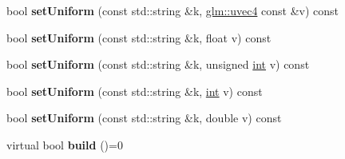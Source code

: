 \begin{DoxyCompactItemize}
\item 
\hypertarget{classgdl_1_1_a_shader_a8b800fb21a0071a28e6093ab99501ae8}{}bool {\bfseries set\+Uniform} (const std\+::string \&k, \hyperlink{group__core__types_gae85130f09c272fcd64da1353c09dddef}{glm\+::uvec4} const \&v) const \label{classgdl_1_1_a_shader_a8b800fb21a0071a28e6093ab99501ae8}

\item 
\hypertarget{classgdl_1_1_a_shader_aa166b1e4cd12cf7e157659946861d121}{}bool {\bfseries set\+Uniform} (const std\+::string \&k, float v) const \label{classgdl_1_1_a_shader_aa166b1e4cd12cf7e157659946861d121}

\item 
\hypertarget{classgdl_1_1_a_shader_ad6091e0ccecf8c062e46482d793e0d6c}{}bool {\bfseries set\+Uniform} (const std\+::string \&k, unsigned \hyperlink{_s_d_l__thread_8h_a6a64f9be4433e4de6e2f2f548cf3c08e}{int} v) const \label{classgdl_1_1_a_shader_ad6091e0ccecf8c062e46482d793e0d6c}

\item 
\hypertarget{classgdl_1_1_a_shader_adde4f6da14c5fd786152d81d0a3bb77f}{}bool {\bfseries set\+Uniform} (const std\+::string \&k, \hyperlink{_s_d_l__thread_8h_a6a64f9be4433e4de6e2f2f548cf3c08e}{int} v) const \label{classgdl_1_1_a_shader_adde4f6da14c5fd786152d81d0a3bb77f}

\item 
\hypertarget{classgdl_1_1_a_shader_a882bdda898c0f8a63b3ced52f933e4ef}{}bool {\bfseries set\+Uniform} (const std\+::string \&k, double v) const \label{classgdl_1_1_a_shader_a882bdda898c0f8a63b3ced52f933e4ef}

\item 
\hypertarget{classgdl_1_1_a_shader_a0717c838d5a465332be5b91d12d2dbb5}{}virtual bool {\bfseries build} ()=0\label{classgdl_1_1_a_shader_a0717c838d5a465332be5b91d12d2dbb5}

\end{DoxyCompactItemize}
